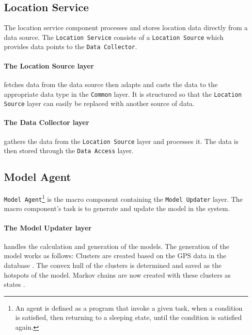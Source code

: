 \subsection{Location Service} 
The location service component processes and stores location data directly from a data source. 
The \texttt{Location Service} consists of a \texttt{Location Source} which provides data points to the \texttt{Data Collector}.

\paragraph{The Location Source layer} fetches data from the data source then adapts and casts the data to the appropriate data type in the \texttt{Common} layer.
It is structured so that the \texttt{Location Source} layer can easily be replaced with another source of data.

\paragraph{The Data Collector layer} gathers the data from the \texttt{Location Source} layer and processes it. 
The data is then stored through the \texttt{Data Access} layer.

\subsection{Model Agent}
\texttt{Model Agent}\footnote{An agent is defined as a program that invoke a given task, when a condition is satisfied, then returning to a sleeping state, until the condition is satisfied again.\cite{definitionagent}} is the macro component containing the \texttt{Model Updater} layer.
The macro component's task is to generate and update the model in the system. 

\paragraph{The Model Updater layer} handles the calculation and generation of the models.
The generation of the model works as follows:
Clusters are created based on the GPS data in the database .
The convex hull of the clusters is determined and saved as the hotspots of the model.
Markov chains are now created with these clusters as states .

